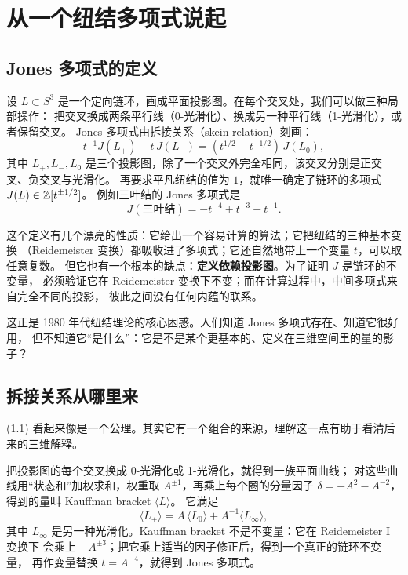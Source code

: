 \section{从一个纽结多项式说起}

\subsection{Jones 多项式的定义}

设 $L\subset S^3$ 是一个定向链环，画成平面投影图。在每个交叉处，我们可以做三种局部操作：
把交叉换成两条平行线（0-光滑化）、换成另一种平行线（1-光滑化），或者保留交叉。
Jones 多项式由拆接关系（skein relation）刻画：
\begin{equation}
t^{-1}J(L_+)-t\,J(L_-)=(t^{1/2}-t^{-1/2})\,J(L_0), \tag{1.1}
\end{equation}
其中 $L_+,L_-,L_0$ 是三个投影图，除了一个交叉外完全相同，该交叉分别是正交叉、负交叉与光滑化。
再要求平凡纽结的值为 $1$，就唯一确定了链环的多项式 $J(L)\in\mathbb{Z}[t^{\pm1/2}]$。
例如三叶结的 Jones 多项式是
\[
J(\text{三叶结})=-t^{-4}+t^{-3}+t^{-1}.
\]

这个定义有几个漂亮的性质：它给出一个容易计算的算法；它把纽结的三种基本变换
（Reidemeister 变换）都吸收进了多项式；它还自然地带上一个变量 $t$，可以取任意复数。
但它也有一个根本的缺点：\textbf{定义依赖投影图}。为了证明 $J$ 是链环的不变量，
必须验证它在 Reidemeister 变换下不变；而在计算过程中，中间多项式来自完全不同的投影，
彼此之间没有任何内蕴的联系。

这正是 1980 年代纽结理论的核心困惑。人们知道 Jones 多项式存在、知道它很好用，
但不知道它“是什么”：它是不是某个更基本的、定义在三维空间里的量的影子？

\subsection{拆接关系从哪里来}

(1.1) 看起来像是一个公理。其实它有一个组合的来源，理解这一点有助于看清后来的三维解释。

把投影图的每个交叉换成 0-光滑化或 1-光滑化，就得到一族平面曲线；
对这些曲线用“状态和”加权求和，权重取 $A^{\pm1}$，再乘上每个圈的分量因子
$\delta=-A^2-A^{-2}$，得到的量叫 Kauffman bracket $\langle L\rangle$。
它满足
\[
\langle L_+\rangle=A\,\langle L_0\rangle+A^{-1}\langle L_\infty\rangle,
\]
其中 $L_\infty$ 是另一种光滑化。Kauffman bracket 不是不变量：它在 Reidemeister I 变换下
会乘上 $-A^{\pm3}$；把它乘上适当的因子修正后，得到一个真正的链环不变量，
再作变量替换 $t=A^{-4}$，就得到 Jones 多项式。

